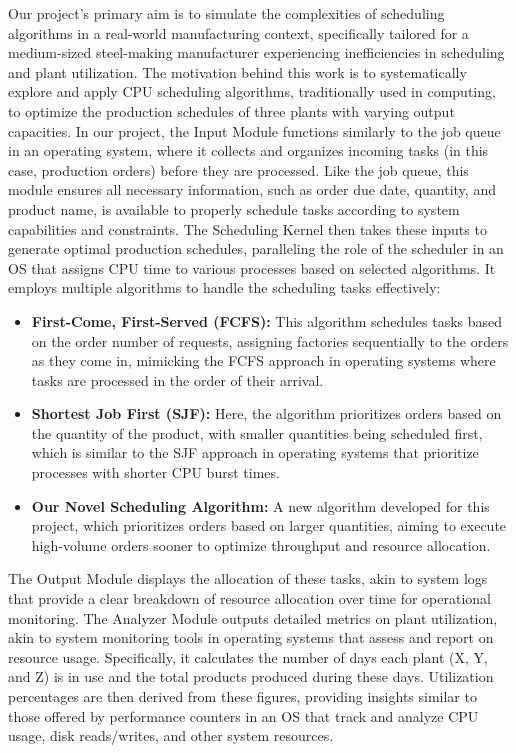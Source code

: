 \documentclass[conference]{IEEEtran}
\begin{document}
Our project's primary aim is to simulate the complexities of scheduling algorithms in a real-world manufacturing context, specifically tailored for a medium-sized steel-making manufacturer experiencing inefficiencies in scheduling and plant utilization. The motivation behind this work is to systematically explore and apply CPU scheduling algorithms, traditionally used in computing, to optimize the production schedules of three plants with varying output capacities. In our project, the Input Module functions similarly to the job queue in an operating system, where it collects and organizes incoming tasks (in this case, production orders) before they are processed. Like the job queue, this module ensures all necessary information, such as order due date, quantity, and product name, is available to properly schedule tasks according to system capabilities and constraints. The Scheduling Kernel then takes these inputs to generate optimal production schedules, paralleling the role of the scheduler in an OS that assigns CPU time to various processes based on selected algorithms. It employs multiple algorithms to handle the scheduling tasks effectively:
\begin{itemize}
    \item \textbf{First-Come, First-Served (FCFS):} This algorithm schedules tasks based on the order number of requests, assigning factories sequentially to the orders as they come in, mimicking the FCFS approach in operating systems where tasks are processed in the order of their arrival.
\end{itemize}
\begin{itemize}
    \item \textbf{Shortest Job First (SJF):} Here, the algorithm prioritizes orders based on the quantity of the product, with smaller quantities being scheduled first, which is similar to the SJF approach in operating systems that prioritize processes with shorter CPU burst times.
\end{itemize}
\begin{itemize}
    \item \textbf{Our Novel Scheduling Algorithm:} A new algorithm developed for this project, which prioritizes orders based on larger quantities, aiming to execute high-volume orders sooner to optimize throughput and resource allocation.
\end{itemize}
The Output Module displays the allocation of these tasks, akin to system logs that provide a clear breakdown of resource allocation over time for operational monitoring. The Analyzer Module outputs detailed metrics on plant utilization, akin to system monitoring tools in operating systems that assess and report on resource usage. Specifically, it calculates the number of days each plant (X, Y, and Z) is in use and the total products produced during these days. Utilization percentages are then derived from these figures, providing insights similar to those offered by performance counters in an OS that track and analyze CPU usage, disk reads/writes, and other system resources.
\end{document}
